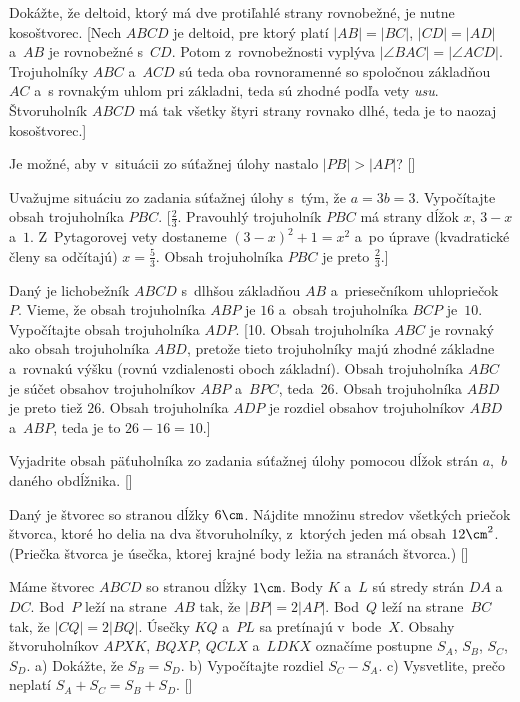 {Dokážte, že deltoid, ktorý má dve protiľahlé strany rovnobežné, je nutne kosoštvorec. [Nech $ABCD$ je deltoid, pre ktorý platí $|AB| = |BC|$, $|CD|= |AD| $ a~$AB$ je rovnobežné s~$CD$. Potom z~rovnobežnosti vyplýva $|\angle BAC| = |\angle ACD|$. Trojuholníky $ABC$ a~$ACD$ sú teda oba rovnoramenné so spoločnou základňou $AC$ a~s rovnakým uhlom pri základni, teda sú zhodné podľa vety {\it usu}. Štvoruholník $ABCD$ má tak všetky
štyri strany rovnako dlhé, teda je to naozaj kosoštvorec.]

Je možné, aby v~situácii zo súťažnej úlohy nastalo $|PB|>|AP|$? []

Uvažujme situáciu zo zadania súťažnej úlohy s~tým, že $a=3b=3$. Vypočítajte obsah trojuholníka $PBC$. [$\frac23$. Pravouhlý trojuholník $PBC$ má strany dĺžok $x$, $3-x$ a~$1$.
Z~Pytagorovej vety dostaneme $(3-x)^2 + 1 = x^2$ a~po úprave (kvadratické členy sa odčítajú) $x=\tfrac53$.
Obsah trojuholníka $PBC$ je preto
$\frac{2}{3}$.]

\D
Daný je lichobežník $ABCD$ s~dlhšou základňou $AB$
a~priesečníkom uhlopriečok~$P$.
Vieme, že obsah trojuholníka $ABP$ je $16$ a~obsah trojuholníka $BCP$ je~$10$.
Vypočítajte obsah trojuholníka $ADP$. [10. Obsah trojuholníka $ABC$ je rovnaký ako obsah trojuholníka $ABD$, pretože tieto trojuholníky majú zhodné základne a~rovnakú výšku (rovnú vzdialenosti oboch základní). Obsah trojuholníka $ABC$ je súčet obsahov trojuholníkov $ABP$ a~$BPC$, teda~$26$. Obsah trojuholníka $ABD$ je preto tiež $26$.
Obsah trojuholníka $ADP$ je rozdiel obsahov trojuholníkov $ABD$ a~$ABP$, teda je to $26 -16 = 10$.]

Vyjadrite obsah päťuholníka zo zadania súťažnej úlohy pomocou dĺžok strán $a$,~$b$ daného obdĺžnika. []

Daný je štvorec so stranou dĺžky $6\cm$. Nájdite množinu stredov všetkých priečok štvorca, ktoré ho delia na dva štvoruholníky, z~ktorých jeden má obsah $12\cm^2$. (Priečka štvorca je úsečka, ktorej krajné body ležia na stranách štvorca.)
[]

Máme štvorec $ABCD$ so stranou dĺžky $1\cm$. Body $K$ a~$L$ sú
stredy strán $DA$ a~$DC$. Bod~$P$ leží na strane~$AB$ tak, že $|BP| =
2|AP|$. Bod~$Q$ leží na strane~$BC$ tak, že $|CQ| = 2|BQ|$. Úsečky
$KQ$ a~$PL$ sa pretínajú v~bode~$X$. Obsahy štvoruholníkov $APXK$,
$BQXP$, $QCLX$ a~$LDKX$ označíme postupne $S_A$, $S_B$, $S_C$, $S_D$.
a) Dokážte, že $S_B=S_D$.
b) Vypočítajte rozdiel $S_C-S_A$.
c) Vysvetlite, prečo neplatí $S_A + S_C = S_B + S_D$.
[]


}


